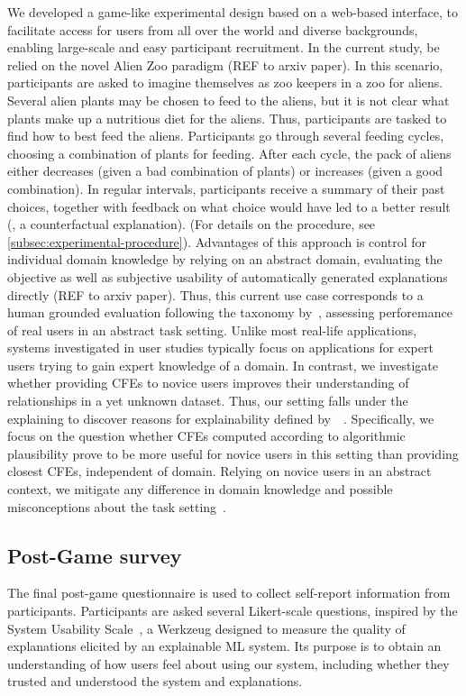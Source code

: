\textcolor{ACMDarkBlue}{
We developed a game-like experimental design based on a web-based interface, to facilitate access for users from all over the world and diverse backgrounds, enabling large-scale and easy participant recruitment.
}
\textcolor{ACMDarkBlue}{
In the current study, be relied on the novel Alien Zoo paradigm (REF to arxiv paper).
} \textcolor{ACMDarkBlue}{
In this scenario, participants are asked to imagine themselves as zoo keepers in a zoo for aliens. Several alien plants may be chosen to feed to the aliens, but it is not clear what plants make up a nutritious diet for the aliens. Thus, participants are tasked to find how to best feed the aliens.
Participants go through several feeding cycles, choosing a combination of plants for feeding. After each cycle, the pack of aliens either decreases (given a bad combination of plants) or increases (given a good combination). 
In regular intervals, participants receive a summary of their past choices, together with feedback on what choice would have led to a better result (\ie, a counterfactual explanation). 
(For details on the procedure, see \ref{subsec:experimental-procedure}).
} \textcolor{ACMDarkBlue}{
Advantages of this approach is control for individual domain knowledge by relying on an abstract domain, evaluating the objective as well as subjective usability of automatically generated explanations directly (REF to arxiv paper).
} \textcolor{ACMDarkBlue}{
Thus, this current use case corresponds to a human grounded evaluation following the taxonomy by~\citeauthor{doshi-velez_towards_2017}, assessing perforemance of real users in an abstract task setting.
} \textcolor{ACMDarkBlue}{
Unlike most real-life applications, systems investigated in user studies typically focus on applications for expert users trying to gain expert knowledge of a domain. 
In contrast, we investigate whether providing \glspl{CFE} to novice users improves their understanding of relationships in a yet unknown dataset. 
Thus, our setting falls under the explaining to discover reasons for explainability defined by~\citeauthor{adadi_peeking_2018}~\citep{adadi_peeking_2018}.
Specifically, we focus on the question whether \glspl{CFE} computed according to algorithmic plausibility prove to be more useful for novice users in this setting than providing closest \glspl{CFE}, independent of domain.
Relying on novice users in an abstract context, we mitigate any difference in domain knowledge and possible misconceptions about the task setting~\citep{van_der_waa_evaluating_2021}.
}

\subsection{Post-Game survey}
\textcolor{ACMDarkBlue}{
The final post-game questionnaire is used to collect self-report information from participants. Participants are asked several Likert-scale questions, inspired by the System Usability Scale~\citep{holzinger_measuring_2020}, a Werkzeug designed to measure the quality of explanations elicited by an explainable ML system.
Its purpose is to obtain an understanding of how users feel about using our system, including whether they trusted and understood the system and explanations.
}

